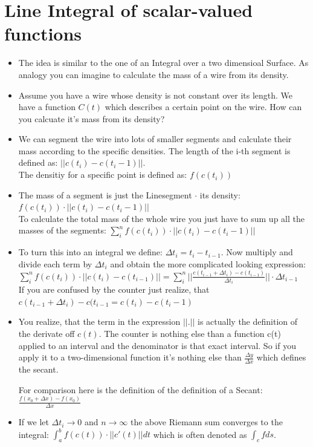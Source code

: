 \documentclass[12pt,a4paper]{article}
\begin{document}
	\newpage
	\section{Line Integral of scalar-valued functions}
	
	\begin{itemize}
	
	\item The idea is similar to the one of an Integral over a two dimensioal Surface. As analogy you can imagine to calculate the mass of a wire from its density. 
	
	\item Assume you have a wire whose density is not constant over its length. We have a function $C(t)$ which describes a certain point on the wire. How can you calcuate it's mass from its density?
	
	\item We can segment the wire into lots of smaller segments and calculate their mass according to the specific densities. The length of the i-th segment is defined as: $||c(t_i) - c(t_i -1)||$. \\
	The densitiy for a specific point is defined as: $f(c(t_i))$
	
	\item The mass of a segment is just the Linesegment $\cdot$ its density: \\
	$f(c(t_i))\cdot||c(t_i) - c(t_i -1)||$ \\
	To calculate the total mass of the whole wire you just have to sum up all the masses of the segments: $\sum_{i}^{n} f(c(t_i))\cdot||c(t_i) - c(t_i -1)||$
	
	\item To turn this into an integral we define: $ \Delta t_i = t_i - t_{i-1}$. Now multiply and divide each term by $\Delta t_i$ and obtain the more complicated looking expression: \\
	$\sum_{i}^{n} f(c(t_i))\cdot ||c(t_i)-c(t_{i-1})|| = \sum_{i}^{n}     ||\frac{c(t_{i-1} + \Delta t_i)-c(t_{i-1})}{\Delta t_i}|| \cdot \Delta t_{i-1}$\\
	If you are confused by the counter just realize, that $c(t_{i-1} + \Delta t_i)-c(t_{i-1} = c(t_i) - c(t_i -1)$
	
	\item You realize, that the term in the expression $||.||$ is actually the definition of the derivate off $c(t)$. The counter is nothing else than a function c(t) applied to an interval and the denominator is that exact interval. So if you apply it to a two-dimensional function it's nothing else than $\frac{\Delta y}{\Delta x}$ which defines the secant. 
	
	For comparison here is the definition of the definition of a Secant: \\
	$\frac{f(x_0 + \Delta x) - f(x_0)}{\Delta x}$


	\item If we let $\Delta t_i \rightarrow 0$ and $n \rightarrow \infty $ the above Riemann sum converges to the integral:
	$\int_{a}^{b} f(c(t))\cdot ||c'(t)|| dt$ which is often denoted as $\int_{c}^{}f ds$.
	\end{itemize}
	
\end{document}
